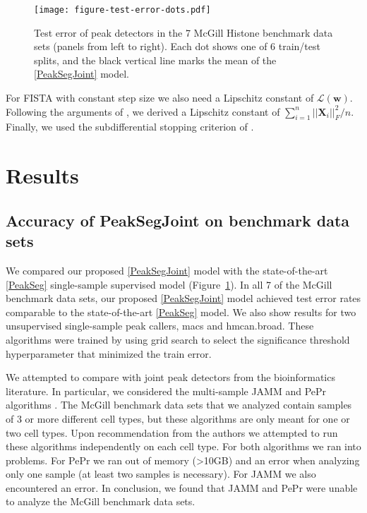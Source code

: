 \documentclass{article} %
\begin{document}
\begin{figure}[b!]
  \centering
  \texttt{[image: figure-test-error-dots.pdf]}
  \caption{Test error of peak detectors in the 7 McGill Histone
    benchmark data sets (panels from left to right). Each dot shows
    one of 6 train/test splits, and the black vertical line marks the
    mean of the \ref{PeakSegJoint} model.}
  \label{fig:test-error-dots}
\end{figure}

For FISTA with constant step size we also need a Lipschitz constant of
$\mathcal L(\mathbf w)$. Following the arguments of
\citet{hingeSquareFISTA}, we derived a Lipschitz constant of
$\sum_{i=1}^n ||\mathbf X_i||_F^2/n$. Finally, we used the
subdifferential stopping criterion of \citet{HOCKING-penalties}.


\section{Results}

\subsection{Accuracy of PeakSegJoint on benchmark data sets}

We compared our proposed \ref{PeakSegJoint} model with the
state-of-the-art \ref{PeakSeg} single-sample supervised model
(Figure~\ref{fig:test-error-dots}). In all 7 of the McGill benchmark
data sets, our proposed \ref{PeakSegJoint} model achieved test error
rates comparable to the state-of-the-art \ref{PeakSeg} model. We also
show results for two unsupervised single-sample %
peak callers, macs and hmcan.broad. These algorithms were trained by
using grid search to select the significance threshold hyperparameter
that minimized the train error.

We attempted to compare with joint peak detectors from the
bioinformatics literature. In particular, we considered the
multi-sample JAMM and PePr algorithms \citep{JAMM, PePr}. The McGill
benchmark data sets that we analyzed contain samples of 3 or more
different cell types, but these algorithms are only meant for one or
two cell types. Upon recommendation from the authors we attempted to
run these algorithms independently on each cell type. For both
algorithms we ran into problems. For PePr we ran out of memory (>10GB)
and an error when analyzing only one sample (at least two samples is
necessary). For JAMM we also encountered an error. In conclusion, we
found that JAMM and PePr were unable to analyze the McGill benchmark
data sets.
\end{document}
